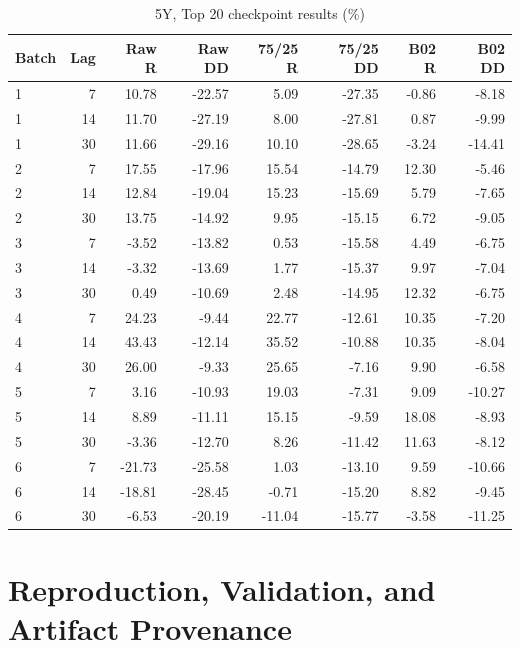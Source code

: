 \documentclass[11pt,a4paper]{article}
\numberwithin{table}{section}
\begin{document}
\begin{minipage}{\linewidth}
\begin{center}\footnotesize\setlength{\tabcolsep}{3pt}\renewcommand{\arraystretch}{1.12}
\begin{longtable}{@{}lrrrrrrr@{}}
\caption{5Y, Top 20 checkpoint results (\%)}\\
\toprule
Batch & Lag & Raw R & Raw DD & 75/25 R & 75/25 DD & B02 R & B02 DD\\\midrule\endhead
1 & 7 & 10.78 & -22.57 & 5.09 & -27.35 & -0.86 & -8.18\\
1 & 14 & 11.70 & -27.19 & 8.00 & -27.81 & 0.87 & -9.99\\
1 & 30 & 11.66 & -29.16 & 10.10 & -28.65 & -3.24 & -14.41\\
2 & 7 & 17.55 & -17.96 & 15.54 & -14.79 & 12.30 & -5.46\\
2 & 14 & 12.84 & -19.04 & 15.23 & -15.69 & 5.79 & -7.65\\
2 & 30 & 13.75 & -14.92 & 9.95 & -15.15 & 6.72 & -9.05\\
3 & 7 & -3.52 & -13.82 & 0.53 & -15.58 & 4.49 & -6.75\\
3 & 14 & -3.32 & -13.69 & 1.77 & -15.37 & 9.97 & -7.04\\
3 & 30 & 0.49 & -10.69 & 2.48 & -14.95 & 12.32 & -6.75\\
4 & 7 & 24.23 & -9.44 & 22.77 & -12.61 & 10.35 & -7.20\\
4 & 14 & 43.43 & -12.14 & 35.52 & -10.88 & 10.35 & -8.04\\
4 & 30 & 26.00 & -9.33 & 25.65 & -7.16 & 9.90 & -6.58\\
5 & 7 & 3.16 & -10.93 & 19.03 & -7.31 & 9.09 & -10.27\\
5 & 14 & 8.89 & -11.11 & 15.15 & -9.59 & 18.08 & -8.93\\
5 & 30 & -3.36 & -12.70 & 8.26 & -11.42 & 11.63 & -8.12\\
6 & 7 & -21.73 & -25.58 & 1.03 & -13.10 & 9.59 & -10.66\\
6 & 14 & -18.81 & -28.45 & -0.71 & -15.20 & 8.82 & -9.45\\
6 & 30 & -6.53 & -20.19 & -11.04 & -15.77 & -3.58 & -11.25\\
\bottomrule\end{longtable}\end{center}
\end{minipage}\par
\section{Reproduction, Validation, and Artifact Provenance}
\end{document}
